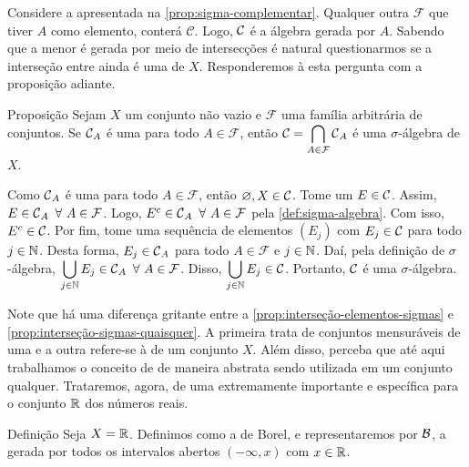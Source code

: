 Considere a \sigal apresentada na \ref{prop:sigma-complementar}. 
Qualquer outra \sigal $\mathcal{F}$ que tiver $A$ como elemento, conterá $\mathcal{C}$.
Logo, $\operatorname{\mathcal{C}}$ é a álgebra gerada por $A$.
Sabendo que a menor \sigal é gerada por meio de intersecções é natural questionarmos se a interseção entre \sigals ainda é uma \sigal de $X$.
Responderemos à esta pergunta com a proposição adiante.
\vspace{-0.1cm}
\begin{env}{Proposição}
\label{prop:interseção-sigmas-quaisquer}
    Sejam $X$ um conjunto não vazio e $\mathcal{F}$ uma família arbitrária de conjuntos.
    Se $\operatorname{\mathcal{C}}_A$ é uma \sigal para todo $A \in \mathcal{F}$, então
    $
    \displaystyle \operatorname{\mathcal{C}} = \bigcap_{A \in \mathcal{F}} \operatorname{\mathcal{C}}_A$ é uma $\sigma$-álgebra de $X$. 
\end{env}
\begin{prova}
    Como $\operatorname{\mathcal{C}}_A$ é uma \sigal para todo $A \in \mathcal{F}$, então 
    $\varnothing, X \in \operatorname{\mathcal{C}}$.
    Tome um $E \in \operatorname{\mathcal{C}}$. 
    Assim, $E \in \operatorname{\mathcal{C}}_A\ \forall\  A \in \mathcal{F}$.
    Logo, $E^c \in \operatorname{\mathcal{C}}_A\ \forall\  A \in \mathcal{F}$ pela \ref{def:sigma-algebra}.
    Com isso, $E^c \in \operatorname{\mathcal{C}}$.
    Por fim, tome uma sequência de elementos $(E_j)$ com $E_j \in \operatorname{\mathcal{C}}$ para todo $j \in \operatorname{\mathbb{N}}$.
    Desta forma, $E_j \in \operatorname{\mathcal{C}}_A$ para todo $A \in \mathcal{F}$ e $j \in \operatorname{\mathbb{N}}$.
    Daí, pela definição de $\sigma$-álgebra, 
    $\displaystyle\bigcup_{j \in \operatorname{\mathbb{N}}} E_j \in \operatorname{\mathcal{C}}_A \ \forall\ A \in \mathcal{F}$.
    Disso, $\displaystyle \bigcup_{j \in \operatorname{\mathbb{N}}} E_j \in \operatorname{\mathcal{C}}$.
    Portanto, $\operatorname{\mathcal{C}}$ é uma $\sigma$-álgebra.
\end{prova}


Note que há uma diferença gritante entre a \ref{prop:interseção-elementos-sigmas} e \ref{prop:interseção-sigmas-quaisquer}.
A primeira trata de conjuntos mensuráveis de uma \sigal e a outra refere-se à \sigals de um conjunto $X$.
Além disso, perceba que até aqui trabalhamos o conceito de \sigal de maneira abstrata sendo utilizada em um conjunto qualquer. 
Trataremos, agora, de uma \sigal extremamente importante e específica para o conjunto $\mathbb{R}$ dos números reais.

\begin{env}{Definição}
\label{def:algebra-borel}
    Seja $X = \mathbb{R}$. Definimos como a \sigal de Borel, e representaremos por $\operatorname{\mathcal{B}}$, a \sigal gerada por todos os intervalos abertos $(-\infty,x)$ com $ x  \in \mathbb{R}$. 
    \vspace{-0.2cm}
\end{env}

